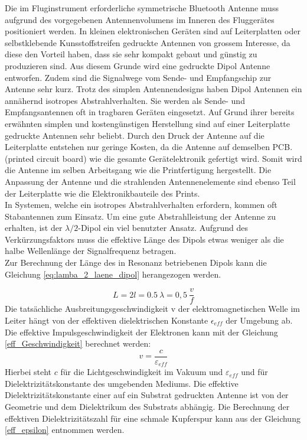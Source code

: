 Die im Fluginstrument erforderliche symmetrische Bluetooth Antenne muss aufgrund des vorgegebenen Antennenvolumens im Inneren des Fluggerätes positioniert werden. In kleinen elektronischen Geräten sind auf Leiterplatten oder selbstklebende Kunsstoffstreifen gedruckte Antennen von grossem Interesse, da diese den Vorteil haben, dass sie sehr kompakt gebaut und günstig zu produzieren sind. Aus diesem Grunde wird eine gedruckte Dipol Antenne entworfen. Zudem sind die Signalwege vom Sende- und Empfangschip zur Antenne sehr kurz. Trotz des simplen Antennendesigns haben Dipol Antennen ein annähernd isotropes Abstrahlverhalten. Sie werden als Sende- und Empfangsantennen oft in  tragbaren Geräten eingesetzt. Auf Grund ihrer bereits erwähnten simplen und kostengünstigen Herstellung sind auf einer Leiterplatte gedruckte Antennen sehr beliebt. Durch den Druck der Antenne auf die Leiterplatte entstehen nur geringe Kosten, da die Antenne auf demselben PCB. (printed circuit board) wie die gesamte Gerätelektronik gefertigt wird. Somit wird die Antenne im selben Arbeitsgang wie die Printfertigung hergestellt. Die  Anpassung der Antenne und die strahlenden Antennenelemente sind ebenso Teil der Leiterplatte wie die Elektronikbauteile des Prints.\\
In Systemen, welche ein isotropes Abstrahlverhalten erfordern, kommen oft Stabantennen zum Einsatz. Um eine gute Abstrahlleistung der Antenne zu erhalten, ist der $\lambda /2$-Dipol ein viel benutzter Ansatz. Aufgrund des Verkürzungsfaktors muss die effektive Länge des Dipols etwas weniger als die halbe Wellenlänge der Signalfrequenz betragen.\\
Zur Berechnung der Länge des in Resonanz betriebenen Dipols kann die  Gleichung \ref{eq:lamba_2_laene_dipol} herangezogen werden.

\begin{equation}\label{eq:lamba_2_laene_dipol}
L = 2l = 0.5 \  \lambda= 0,5 \  \dfrac{v}{f}
\end{equation} 
Die tatsächliche Ausbreitungsgeschwindigkeit v der elektromagnetischen Welle im Leiter hängt von der effektiven dielektrischen Konstante $\epsilon_{eff}$ der Umgebung  ab. 
Die effektive  Impulsgeschwindigkeit der Elektronen kann mit der Gleichung \ref{eff_Geschwindigkeit} berechnet werden:
\begin{equation}\label{eff_Geschwindigkeit}
v = \dfrac{c}{\varepsilon_{eff}}
\end{equation}
Hierbei steht $c$ für die Lichtgeschwindigkeit im Vakuum und $\varepsilon_{eff}$ und für Dielektrizitätskonstante des umgebenden Mediums. Die effektive Dielektrizitätskonstante einer auf ein Substrat gedruckten Antenne ist von der  Geometrie und dem Dielektrikum des Substrats abhängig. Die Berechnung der effektiven Dielektrizitätszahl für eine schmale Kupferspur kann aus der Gleichung \ref{eff_epsilon} entnommen werden. 

